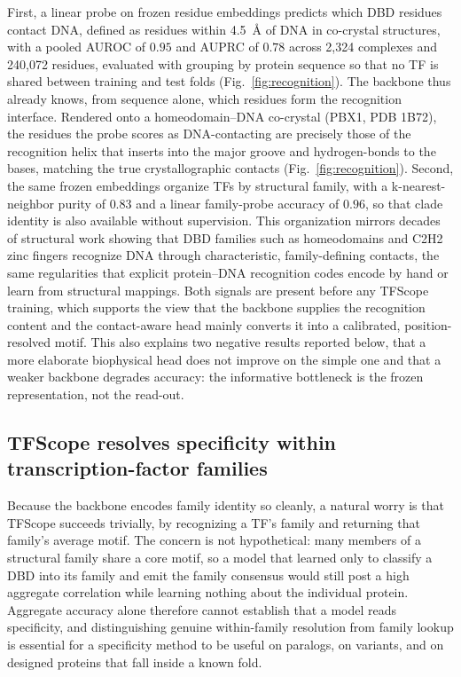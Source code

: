\documentclass[11pt]{article}
\begin{document}
First, a linear probe on frozen residue embeddings predicts which DBD residues
contact DNA, defined as residues within \SI{4.5}{\angstrom} of DNA in co-crystal
structures, with a pooled AUROC of $\mathbf{0.95}$ and AUPRC of $0.78$ across 2,324
complexes and 240,072 residues, evaluated with grouping by protein sequence so that
no TF is shared between training and test folds (Fig.~\ref{fig:recognition}). The
backbone thus already knows, from sequence alone, which residues form the recognition
interface. Rendered onto a homeodomain--DNA co-crystal (PBX1, PDB 1B72), the residues
the probe scores as DNA-contacting are precisely those of the recognition helix that
inserts into the major groove and hydrogen-bonds to the bases, matching the true
crystallographic contacts (Fig.~\ref{fig:recognition}). Second, the same frozen
embeddings organize TFs by structural family, with a k-nearest-neighbor purity of
$0.83$ and a linear family-probe accuracy of $0.96$, so that clade identity is also
available without supervision. This organization mirrors decades of structural
work showing that DBD families such as homeodomains and C2H2 zinc fingers
recognize DNA through characteristic, family-defining
contacts\cite{noyes2008homeodomain,najafabadi2015c2h2}, the same regularities that
explicit protein--DNA recognition codes encode by hand or learn from structural
mappings\cite{wetzel2022rclamps}. Both signals are present before any TFScope training,
which supports the view that the backbone supplies the recognition content and the
contact-aware head mainly converts it into a calibrated, position-resolved motif.
This also explains two negative results reported below, that a more elaborate
biophysical head does not improve on the simple one and that a weaker backbone
degrades accuracy: the informative bottleneck is the frozen representation, not the
read-out.

\subsection*{TFScope resolves specificity within transcription-factor families}

Because the backbone encodes family identity so cleanly, a natural worry is that
TFScope succeeds trivially, by recognizing a TF's family and returning that family's
average motif. The concern is not hypothetical: many members of a structural family
share a core motif, so a model that learned only to classify a DBD into its family
and emit the family consensus would still post a high aggregate correlation while
learning nothing about the individual protein. Aggregate accuracy alone therefore
cannot establish that a model reads specificity, and distinguishing genuine
within-family resolution from family lookup is essential for a specificity method to
be useful on paralogs, on variants, and on designed proteins that fall inside a known
fold.
\end{document}
